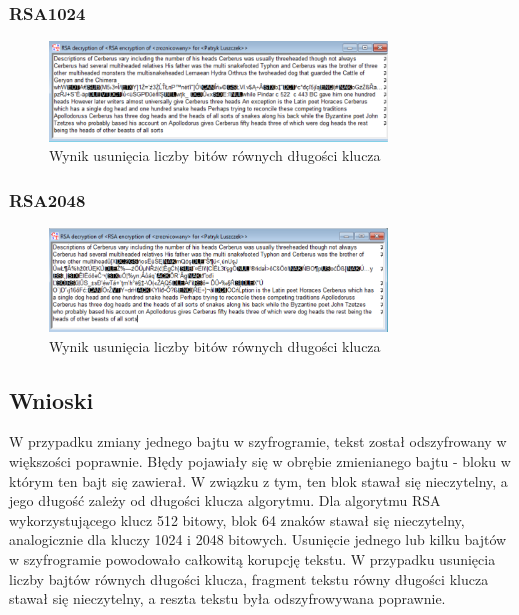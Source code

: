 \documentclass{article}
\begin{document}
\subsubsection{RSA1024}
\begin{figure}[H]
    \centering
    \includegraphics[width=0.8\textwidth]{usunklucz_1024.png}
    \caption{Wynik usunięcia liczby bitów równych długości klucza}
\end{figure}
\subsubsection{RSA2048}
\begin{figure}[H]
    \centering
    \includegraphics[width=0.8\textwidth]{usunklucz_2048.png}
    \caption{Wynik usunięcia liczby bitów równych długości klucza}
\end{figure}
\subsection*{Wnioski}
W przypadku zmiany jednego bajtu w szyfrogramie, tekst został odszyfrowany w większości poprawnie. Błędy pojawiały się w obrębie zmienianego bajtu - bloku w którym ten bajt się zawierał.
W związku z tym, ten blok stawał się nieczytelny, a jego długość zależy od długości klucza algorytmu. Dla algorytmu RSA wykorzystującego klucz 512 bitowy, blok 64 znaków stawał się nieczytelny, analogicznie dla kluczy 1024 i 2048 bitowych.
Usunięcie jednego lub kilku bajtów w szyfrogramie powodowało całkowitą korupcję tekstu. W przypadku usunięcia liczby bajtów równych długości klucza, fragment tekstu równy długości klucza stawał się nieczytelny, a reszta tekstu była odszyfrowywana poprawnie.
\end{document}
